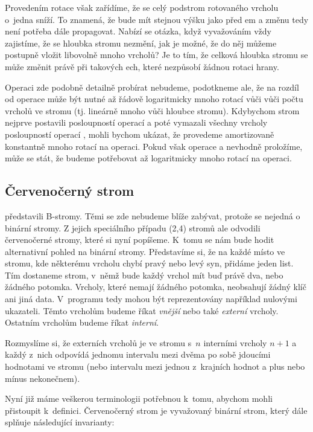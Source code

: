 Provedením rotace však zařídíme, že se celý podstrom rotovaného vrcholu o~jedna
sníží. To znamená, že bude mít stejnou výšku jako před em a změnu tedy
není potřeba dále propagovat. Nabízí se otázka, když vyvažováním vždy
zajistíme, že se hloubka stromu nezmění, jak je možné, že do něj můžeme
postupně vložit libovolně mnoho vrcholů? Je to tím, že celková hloubka stromu
se může změnit právě při takových ech, které nezpůsobí žádnou
rotaci hrany.

Operaci  zde podobně detailně probírat nebudeme, podotkneme ale, že na rozdíl od operace  může být nutné až řádově logaritmicky mnoho rotací vůči vůči počtu vrcholů ve stromu (tj. lineárně mnoho vůči hloubce stromu). Kdybychom strom nejprve postavili posloupností operací  a poté vymazali všechny vrcholy posloupností operací , mohli bychom ukázat, že provedeme amortizovaně konstantně mnoho rotací na operaci. Pokud však operace  a  nevhodně proložíme, může se stát, že budeme potřebovat až logaritmicky mnoho rotací na operaci.



\subsection{Červenočerný strom}\label{sec:RB}

\citet{btrees} představili B-stromy. Těmi se zde nebudeme blíže zabývat, protože se nejedná o binární stromy. Z jejich speciálního případu (2,4) stromů ale \citet{redblack} odvodili červenočerné stromy, které si nyní popíšeme. K~tomu se nám bude hodit alternativní pohled na binární stromy.
Představíme si, že na každé místo ve stromu, kde některému vrcholu chybí pravý nebo levý syn, přidáme jeden list.
Tím dostaneme strom, v~němž bude každý vrchol mít buď právě dva, nebo
žádného potomka. Vrcholy, které nemají žádného potomka, neobsahují žádný klíč
ani jiná data. V~programu tedy mohou být reprezentovány například nulovými
ukazateli. Těmto vrcholům budeme říkat \emph{vnější} nebo také \emph{externí}
vrcholy. Ostatním vrcholům budeme říkat \emph{interní}.

Rozmyslíme si, že externích vrcholů je ve stromu s~$n$ 
interními vrcholy $n+1$ a každý z~nich odpovídá jednomu intervalu mezi dvěma po sobě
jdoucími hodnotami ve stromu (nebo intervalu mezi jednou z~krajních hodnot a
plus nebo mínus nekonečnem).

Nyní již máme veškerou terminologii potřebnou k~tomu, abychom mohli přistoupit k~definici. Červenočerný strom je vyvažovaný binární strom, který dále splňuje následující invarianty:

